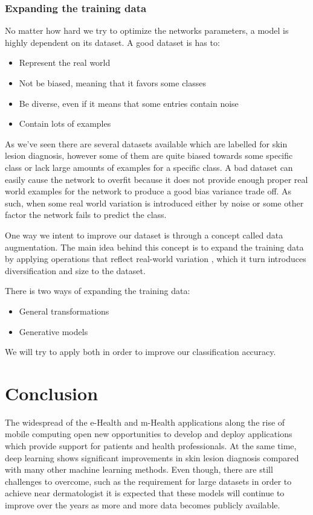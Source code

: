 \documentclass[journal,compsoc]{IEEEtran}
\begin{document}
\subsubsection{Expanding the training data}
No matter how hard we try to optimize the networks parameters, a model is highly dependent on its dataset. A good dataset is has to:
\begin{itemize}
\item Represent the real world
\item Not be biased, meaning that it favors some classes
\item Be diverse, even if it means that some entries contain noise
\item Contain lots of examples
\end{itemize}
As we've seen there are several datasets available which are labelled for skin lesion diagnosis, however some of them are quite biased towards some specific class or lack large amounts of examples for a specific class. A bad dataset can easily cause the network to overfit because it does not provide enough proper real world examples for the network to produce a good bias variance trade off. As such, when some real world variation is introduced either by noise or some other factor the network fails to predict the class. \par
One way we intent to improve our dataset is through a concept called data augmentation. The main idea behind this concept is to expand the training data by applying operations that reflect real-world variation \cite{Nielsen2017a}, which it turn introduces diversification and size to the dataset.\par 
There is two ways of expanding the training data: 
\begin{itemize}
\item General transformations
\item Generative models
\end{itemize}
We will try to apply both in order to improve our classification accuracy.
\section{Conclusion}
The widespread of the e-Health and m-Health applications along the rise of mobile computing open new opportunities to develop and deploy applications which provide support for patients and health professionals. At the same time, deep learning shows significant improvements in skin lesion diagnosis compared with many other machine learning methods. Even though, there are still challenges to overcome, such as the requirement for large datasets in order to achieve near dermatologist it is expected that these models will continue to improve over the years as more and more data becomes publicly available.
\end{document}
